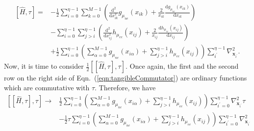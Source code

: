 \begin{equation}
    \begin{split}
        [\hat{H}, \tau]=&-\frac{1}{2}\sum_{i=0}^{\eta-1}\sum_{k=0}^{M-1}\left(\frac{\text{d}^2}{\text{d}x_{ik}^2}g_{\mu_{ne}}(x_{ik})+\frac{2}{x_{ik}}\frac{\text{d}g_{\mu_{ne}}(x_{ik})}{\text{d}x_{ik}}\right)\\
        &-\sum_{i=0}^{\eta-1}\sum_{j>i}^{\eta-1}\left(\frac{\text{d}^2}{\text{d}x_{ij}^2}h_{\mu_{ee}}(x_{ij})+\frac{2}{x_{ij}}\frac{\text{d}h_{\mu_{ee}}(x_{ij})}{\text{d}x_{ij}}\right) \\
        &+\frac{1}{2}\sum_{i=0}^{\eta-1}\left(\sum_{\alpha=0}^{M-1}g_{\mu_{ne}}(x_{i\alpha})+\sum_{j>i}^{\eta-1}h_{\mu_{ee}}(x_{ij})\right)\sum_{i^{\prime}}^{\eta-1}\nabla_{\textbf{x}_{i^{\prime}}}^2.
    \end{split}
    \label{eqn:tangibleCommutator}   
\end{equation}
Now, it is time to consider $\frac{1}{2}\left[[\hat{H},\tau],\tau\right]$. Once again, the first and the second row on the right side of Eqn.~(\ref{eqn:tangibleCommutator}) are ordinary functions which are commutative with $\tau$. Therefore, we have
\begin{equation}
    \begin{split}
        \left[[\hat{H},\tau],\tau\right]\rightarrow&\frac{1}{2}\sum_{i=0}^{\eta-1}\left(\sum_{\alpha=0}^{M-1}g_{\mu_{ne}}(x_{i\alpha})+\sum_{j>i}^{\eta-1}h_{\mu_{ee}}(x_{ij})\right)\sum_{i^{\prime}=0}^{\eta-1}\nabla_{\textbf{x}_{i^{\prime}}}^2\tau\\
        &-\frac{1}{2}\tau\sum_{i=0}^{\eta-1}\left(\sum_{\alpha=0}^{M-1}g_{\mu_{ne}}(x_{i\alpha})+\sum_{j>i}^{\eta-1}h_{\mu_{ee}}(x_{ij})\right)\sum_{i^{\prime}=0}^{\eta-1}\nabla_{\textbf{x}_{i^{\prime}}}^2
    \end{split}   
\end{equation}
